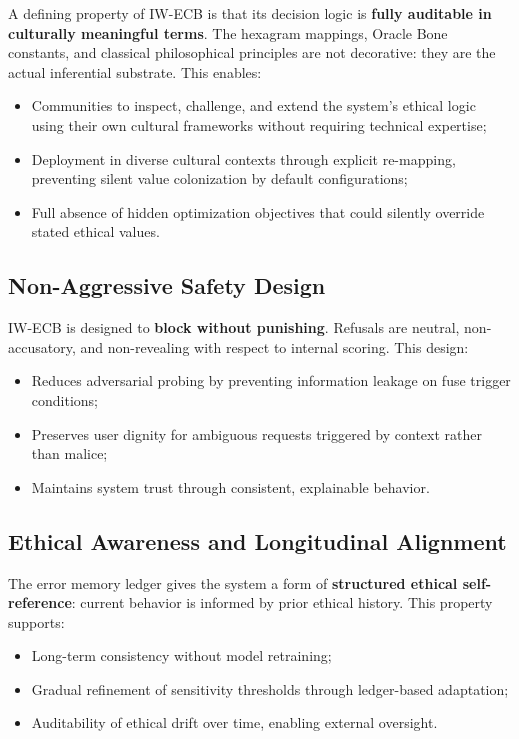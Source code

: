 \documentclass[conference]{IEEEtran}
\begin{document}
A defining property of IW-ECB is that its decision logic
is \textbf{fully auditable in culturally meaningful terms}.
The hexagram mappings, Oracle Bone constants, and classical
philosophical principles are not decorative: they are the
actual inferential substrate. This enables:

\begin{itemize}
  \item Communities to inspect, challenge, and extend the
        system's ethical logic using their own cultural
        frameworks without requiring technical expertise;
  \item Deployment in diverse cultural contexts through
        explicit re-mapping, preventing silent value
        colonization by default configurations;
  \item Full absence of hidden optimization objectives
        that could silently override stated ethical values.
\end{itemize}

\subsection{Non-Aggressive Safety Design}

IW-ECB is designed to \textbf{block without punishing}.
Refusals are neutral, non-accusatory, and non-revealing
with respect to internal scoring. This design:

\begin{itemize}
  \item Reduces adversarial probing by preventing
        information leakage on fuse trigger conditions;
  \item Preserves user dignity for ambiguous requests
        triggered by context rather than malice;
  \item Maintains system trust through consistent,
        explainable behavior.
\end{itemize}

\subsection{Ethical Awareness and Longitudinal Alignment}

The error memory ledger gives the system a form of
\textbf{structured ethical self-reference}: current
behavior is informed by prior ethical history. This
property supports:

\begin{itemize}
  \item Long-term consistency without model retraining;
  \item Gradual refinement of sensitivity thresholds
        through ledger-based adaptation;
  \item Auditability of ethical drift over time,
        enabling external oversight.
\end{itemize}
\end{document}
